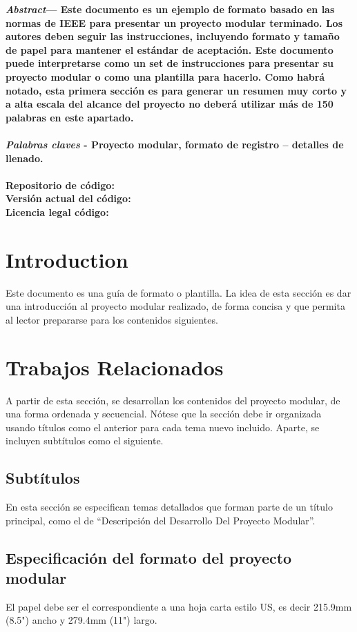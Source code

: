 \documentclass[10pt,twocolumn,letterpaper]{article}
\begin{document}
\noindent\textbf{\textit{Abstract}— Este documento es un ejemplo de formato basado en las normas de IEEE para presentar un proyecto modular terminado. Los autores deben seguir las instrucciones, incluyendo formato y tamaño de papel para mantener el estándar de aceptación. Este documento puede interpretarse como un set de instrucciones para presentar su proyecto modular o como una plantilla para hacerlo. Como habrá notado, esta primera sección es para generar un resumen muy corto y a alta escala del alcance del proyecto no deberá utilizar más de 150 palabras en este apartado.\\
	\\
	\textit{Palabras claves} - Proyecto modular, formato de registro – detalles de llenado.\\
	\\
	Repositorio de código:\\
	Versión actual del código:\\
	Licencia legal código:
}

\section{Introduction}
Este documento es una guía de formato o plantilla. La idea de esta sección es dar una introducción al proyecto modular realizado, de forma concisa y que permita al lector prepararse para los contenidos siguientes.

\section{Trabajos Relacionados}
A partir de esta sección, se desarrollan los contenidos del proyecto modular, de una forma ordenada y secuencial. Nótese que la sección debe ir organizada usando títulos como el anterior para cada tema nuevo incluido. Aparte, se incluyen subtítulos como el siguiente.

\subsection{Subtítulos}
En esta sección se especifican temas detallados que forman parte de un título principal, como el de “Descripción del Desarrollo Del Proyecto Modular”.

\subsection{Especificación del formato del proyecto modular}
El papel debe ser el correspondiente a una hoja carta estilo US, es decir 215.9mm (8.5") ancho y 279.4mm (11") largo.
\end{document}
